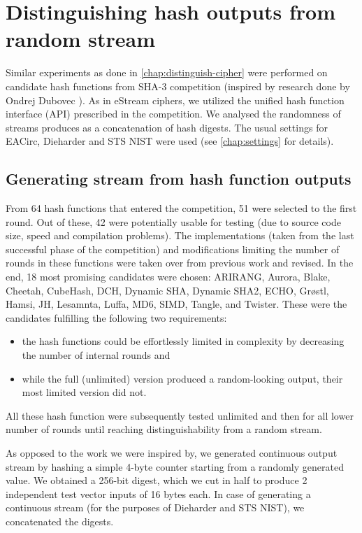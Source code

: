 \documentclass[12pt,oneside]{fithesis2}		%
\renewcommand{\_}{\leavevmode \kern0.0em\vbox{\hrule width0.4em}}
\newcommand{\squarebullet}{\textcolor{black}{\raisebox{0.15em}{\rule{4pt}{4pt}}}}
\newenvironment{myItemize}{
  \begin{itemize}[leftmargin=2em,rightmargin=1em,itemsep=\parskip ,parsep=0em,topsep=0em,partopsep=0em]
  \renewcommand{\labelitemi}{\squarebullet}
  \renewcommand{\labelitemii}{$\diamond$}
}{
  \end{itemize}
}
\begin{document}
\chapter{Distinguishing hash outputs from random stream}
\label{chap:distinguish-hash}

Similar experiments as done in \autoref{chap:distinguish-cipher} were performed on candidate hash functions from SHA-3 competition
\parencite{sha3-competition}
(inspired by research done by Ondrej Dubovec \parencite{thesis-dubovec}).
As in eStream ciphers, we utilized the unified hash function interface (API) prescribed in the competition.
We analysed the randomness of streams produces as a concatenation of hash digests.
The usual settings for EACirc, Dieharder and STS NIST were used (see \autoref{chap:settings} for details).

\section{Generating stream from hash function outputs}
\label{sec:hash-settings}

From 64 hash functions that entered the competition, 51 were selected to the first round. 
Out of these, 42 were potentially usable for testing (due to source code size, speed and compilation problems).
The implementations (taken from the last successful phase of the competition) and
modifications limiting the number of rounds in these functions were taken over from previous work \parencite{thesis-dubovec}
and revised. In the end, 18 most promising candidates were chosen: ARIRANG, Aurora, Blake, Cheetah, CubeHash, DCH, 
Dynamic SHA, Dynamic SHA2, ECHO, Grøstl, Hamsi, JH, Lesamnta, Luffa, MD6, SIMD, Tangle, and Twister.
These were the candidates fulfilling the following two requirements:
\begin{myItemize}
\item the hash functions could be effortlessly limited in complexity by decreasing the number of internal rounds and
\item while the full (unlimited) version produced a random-looking output, their most limited version did not.
\end{myItemize}
\noindent
All these hash function were subsequently tested unlimited and
then for all lower number of rounds until reaching distinguishability from a random stream.

As opposed to the work we were inspired by, we generated continuous output stream by hashing a simple 4-byte counter starting
from a randomly generated value. We obtained a 256-bit digest, which we cut in half to produce 2 independent test vector inputs
of 16 bytes each. In case of generating a continuous stream (for the purposes of Dieharder and STS NIST), we concatenated 
the digests.
\end{document}
